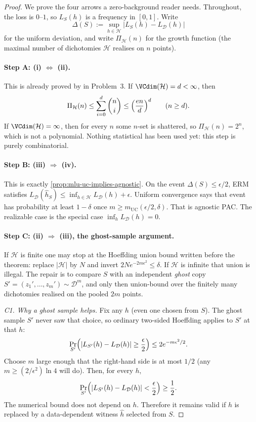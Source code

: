 \begin{proof}
We prove the four arrows a zero-background reader needs. Throughout, the loss is $0$--$1$, so $L_S(h)$ is a frequency in $[0,1]$. Write
\[
\Delta(S)
:=
\sup_{h\in\mathcal{H}}\lvert L_S(h)-L_{\mathcal{D}}(h)\rvert
\]
for the uniform deviation, and write $\Pi_{\mathcal{H}}(n)$ for the growth function (the maximal number of dichotomies $\mathcal{H}$ realises on $n$ points).

\paragraph{Step A: (i) $\Leftrightarrow$ (ii).}
This is  already proved by  in Problem~3. If $\VCdim(\mathcal{H})=d<\infty$, then
\[
\Pi_{\mathcal{H}}(n)
\le
\sum_{i=0}^{d}\binom{n}{i}
\le
\Bigl(\frac{en}{d}\Bigr)^{d}
\qquad(n\ge d).
\]
If $\VCdim(\mathcal{H})=\infty$, then for every $n$ some $n$-set is shattered, so $\Pi_{\mathcal{H}}(n)=2^n$, which is not a polynomial. Nothing statistical has been used yet: this step is purely combinatorial.

\paragraph{Step B: (iii) $\Rightarrow$ (iv).}
This is exactly \cref{prop:mlu-uc-implies-agnostic}. On the event $\Delta(S)\le\epsilon/2$, ERM satisfies $L_{\mathcal{D}}(\widehat h_S)\le\inf_{h\in\mathcal{H}}L_{\mathcal{D}}(h)+\epsilon$. Uniform convergence says that event has probability at least $1-\delta$ once $m\ge m_{\mathrm{UC}}(\epsilon/2,\delta)$. That is agnostic PAC. The realizable case is the special case $\inf_{h}L_{\mathcal{D}}(h)=0$.

\paragraph{Step C: (ii) $\Rightarrow$ (iii), the ghost-sample argument.}
If $\mathcal{H}$ is finite one may stop at the Hoeffding union bound written before the theorem: replace $\lvert\mathcal{H}\rvert$ by $N$ and invert $2Ne^{-2m\epsilon^2}\le\delta$. If $\mathcal{H}$ is infinite that union is illegal. The repair is to compare $S$ with an independent \emph{ghost} copy $S'=(z_1',\dots,z_m')\sim\mathcal{D}^m$, and only then union-bound over the finitely many dichotomies realised on the pooled $2m$ points.

\textit{C1. Why a ghost sample helps.}
Fix any $h$ (even one chosen from $S$). The ghost sample $S'$ never saw that choice, so ordinary two-sided Hoeffding applies to $S'$ at that $h$:
\[
\Pr_{S'}\Bigl(\lvert L_{S'}(h)-L_{\mathcal{D}}(h)\rvert\ge\frac{\epsilon}{2}\Bigr)
\le
2e^{-m\epsilon^2/2}.
\]
Choose $m$ large enough that the right-hand side is at most $1/2$ (any $m\ge(2/\epsilon^2)\ln 4$ will do). Then, for every $h$,
\[
\Pr_{S'}\Bigl(\lvert L_{S'}(h)-L_{\mathcal{D}}(h)\rvert<\frac{\epsilon}{2}\Bigr)
\ge
\frac12.
\]
The numerical bound does not depend on $h$. Therefore it remains valid if $h$ is replaced by a data-dependent witness $\widehat h$ selected from $S$.


\end{proof}
